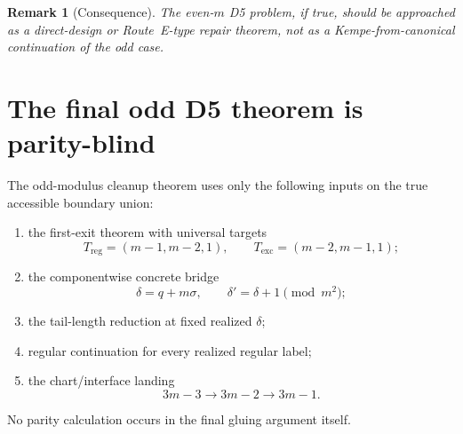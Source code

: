 \documentclass[11pt]{article}
\newtheorem{remark}{Remark}
\begin{document}
\begin{remark}[Consequence]
The even-$m$ D5 problem, if true, should be approached as a direct-design or
Route~E-type repair theorem, not as a Kempe-from-canonical continuation of the
odd case.
\end{remark}

\section{The final odd D5 theorem is parity-blind}

The odd-modulus cleanup theorem uses only the following inputs on the true
accessible boundary union:
\begin{enumerate}[label=\textup{(\roman*)},leftmargin=2.5em]
    \item the first-exit theorem with universal targets
    \[
    T_{\mathrm{reg}}=(m-1,m-2,1),
    \qquad
    T_{\mathrm{exc}}=(m-2,m-1,1);
    \]
    \item the componentwise concrete bridge
    \[
    \delta=q+m\sigma,
    \qquad
    \delta' = \delta+1 \pmod{m^2};
    \]
    \item the tail-length reduction at fixed realized $\delta$;
    \item regular continuation for every realized regular label;
    \item the chart/interface landing
    \[
    3m-3 \to 3m-2 \to 3m-1.
    \]
\end{enumerate}
No parity calculation occurs in the final gluing argument itself.
\end{document}
